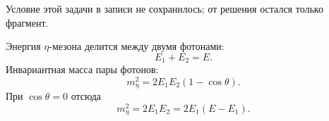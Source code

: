 \documentclass[../final.tex]{subfiles}
\begin{document}
\label{task:eta_gg_sem6}

\remark
Условие этой задачи в записи не сохранилось; от решения остался только фрагмент.

\solution
Энергия $\eta$-мезона делится между двумя фотонами:
\begin{equation*}
    E_1+E_2=E.
\end{equation*}
Инвариантная масса пары фотонов:
\begin{equation*}
    m_\eta^2=2E_1E_2(1-\cos\theta).
\end{equation*}
При $\cos\theta=0$ отсюда
\begin{equation*}
    m_\eta^2=2E_1E_2=2E_1(E-E_1).
\end{equation*}
\end{document}
